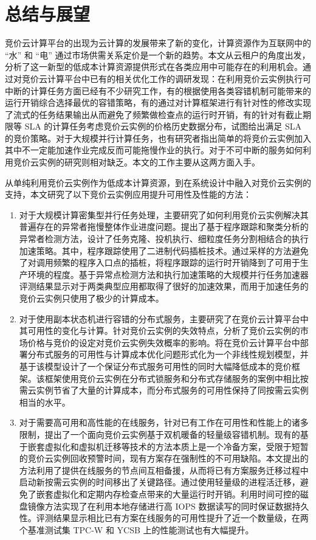 \chapter{总结与展望}
\label{cha:conclusion_futruework}
竞价云计算平台的出现为云计算的发展带来了新的变化，计算资源作为互联网中的 ``水'' 和 ``电'' 通过市场供需关系定价是一个新的趋势。本文从云租户的角度出发，分析了这一新型的低成本计算资源提供形式在各类应用中可能存在的利用机会。通过对竞价云计算平台中已有的相关优化工作的调研发现：在利用竞价云实例执行可中断的计算任务方面已经有不少研究工作，有的根据使用各类容错机制可能带来的运行开销综合选择最优的容错策略，有的通过对计算框架进行有针对性的修改实现了流式的任务结果输出从而避免了频繁做检查点的运行时开销，有的针对有截止期限等 SLA 的计算任务考虑竞价云实例的价格历史数据分布，试图给出满足 SLA 的竞价策略。对于大规模并行计算任务，也有研究者指出简单的将竞价云实例加入其中不一定能加速作业完成反而可能拖慢作业的执行。对于不可中断的服务如何利用竞价云实例的研究则相对缺乏。本文的工作主要从这两方面入手。

从单纯利用竞价云实例作为低成本计算资源，到在系统设计中融入对竞价云实例的支持，本文研究了以下竞价云实例应用提升可用性及性能的方法：
\begin{enumerate}
\item 对于大规模计算密集型并行任务处理，主要研究了如何利用竞价云实例解决其普遍存在的异常者拖慢整体作业进度问题。提出了基于程序跟踪和聚类分析的异常者检测方法，设计了任务克隆、投机执行、细粒度任务分割相结合的执行加速策略。其中，程序跟踪使用了二进制代码插桩技术。通过采样的方法避免了对调用频繁的程序入口点的插桩，将程序跟踪的运行时开销降到了可用于生产环境的程度。基于异常点检测方法和执行加速策略的大规模并行任务加速器评测结果显示对于两类典型应用都取得了很好的加速效果，而用于加速任务的竞价云实例只使用了极少的计算成本。
\item 对于使用副本状态机进行容错的分布式服务，主要研究了在竞价云计算平台中其可用性的变化与计算。针对竞价云实例的失效特点，分析了竞价云实例的市场价格与竞价的设定对竞价云实例失效概率的影响。将在竞价云计算平台中部署分布式服务的可用性与计算成本优化问题形式化为一个非线性规划模型，并基于该模型设计了一个保证分布式服务可用性的同时大幅降低成本的竞价框架。该框架使用竞价云实例在分布式锁服务和分布式存储服务的案例中相比按需云实例节省了大量的计算成本，而分布式服务的可用性保持了同按需云实例相当的水平。
\item 对于需要高可用和高性能的在线服务，针对已有工作在可用性和性能上的诸多限制，提出了一个面向竞价云实例基于双机暖备的轻量级容错机制。现有的基于嵌套虚拟化和虚拟机迁移等技术的方法本质上是一个冷备方案，受限于短暂的竞价云实例回收预警时间，现有方案存在强制性的不可用缺陷。本文提出的方法利用了提供在线服务的节点间互相备援，从而将已有方案服务迁移过程中启动新按需云实例的时间移出了关键路径。通过使用轻量级的进程活迁移，避免了嵌套虚拟化和定期内存检查点带来的大量运行时开销。利用时间可控的磁盘镜像方法实现了在利用本地存储进行高 IOPS 数据读写的同时保证数据持久性。评测结果显示相比已有方案在线服务的可用性提升了近一个数量级，在两个基准测试集 TPC-W 和 YCSB 上的性能测试也有大幅提升。
\end{enumerate}

